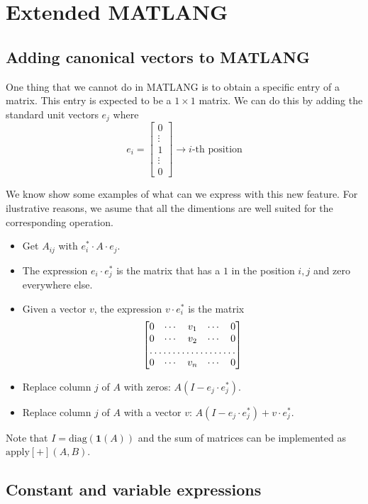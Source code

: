 \section{Extended MATLANG}

\subsection{Adding canonical vectors to MATLANG}
One thing that we cannot do in MATLANG is to obtain a specific entry of a matrix. This entry is expected to be a $1\times 1$ matrix. We can do this by adding the standard unit vectors $e_j$ where 
\[
e_i=
\begin{bmatrix}
    0 \\
    \vdots \\
    1 \\
    \vdots \\
    0
\end{bmatrix}
\rightarrow i\text{-th position}
\]

We know show some examples of what can we express with this new feature. For ilustrative reasons, we asume that all the dimentions are well suited for the corresponding operation.

\begin{itemize}
	\item Get $A_{ij}$ with $e_i^*\cdot A\cdot e_j$.
	\item The expression $e_i\cdot e_j^*$ is the matrix that has a $1$ in the position $i,j$ and zero everywhere else.
	\item Given a vector $v$, the expression $v\cdot e_i^*$ is the matrix 
	\[
\begin{bmatrix}
    0 & \cdots & v_{1} & \cdots & 0 \\
    0 & \cdots & v_{2} & \cdots & 0 \\
    \hdotsfor{5} \\
    0 & \cdots & v_{n} & \cdots & 0 
\end{bmatrix}
\]
	\item Replace column $j$ of $A$ with zeros: $A(I-e_j\cdot e_j^*)$.
	\item Replace column $j$ of $A$ with a vector $v$: $A(I-e_j\cdot e_j^*) + v\cdot e_j^*$.
\end{itemize}

Note that $I=\text{diag}(\mathbf{1}(A))$ and the sum of matrices can be implemented as $\text{apply}\left[ + \right](A, B)$.

\subsection{Constant and variable expressions}

